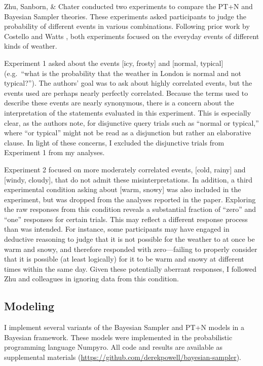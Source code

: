 \documentclass[
  english,
  man,floatsintext]{apa6}
\begin{document}
Zhu, Sanborn, \& Chater \autocite*{chater.etal2020} conducted two experiments to compare the PT+N and Bayesian Sampler theories. These experiments asked participants to judge the probability of different events in various combinations. Following prior work by Costello and Watts \autocites*[e.g.][]{costello.watts2016,costello.watts2018}, both experiments focused on the everyday events of different kinds of weather.

Experiment 1 asked about the events {[}icy, frosty{]} and {[}normal, typical{]} (e.g.~``what is the probability that the weather in London is normal and not typical?''). The authors' goal was to ask about highly correlated events, but the events used are perhaps nearly perfectly correlated. Because the terms used to describe these events are nearly synonymous, there is a concern about the interpretation of the statements evaluated in this experiment. This is especially clear, as the authors note, for disjunctive query trials such as ``normal or typical,'' where ``or typical'' might not be read as a disjunction but rather an elaborative clause. In light of these concerns, I excluded the disjunctive trials from Experiment 1 from my analyses.

Experiment 2 focused on more moderately correlated events, {[}cold, rainy{]} and {[}windy, cloudy{]}, that do not admit these misinterpretations. In addition, a third experimental condition asking about {[}warm, snowy{]} was also included in the experiment, but was dropped from the analyses reported in the paper. Exploring the raw responses from this condition reveals a substantial fraction of ``zero'' and ``one'' responses for certain trials. This may reflect a different response process than was intended. For instance, some participants may have engaged in deductive reasoning to judge that it is not possible for the weather to at once be warm and snowy, and therefore responded with zero---failing to properly consider that it is possible (at least logically) for it to be warm and snowy at different times within the same day. Given these potentially aberrant responses, I followed Zhu and colleagues \autocite*{zhu.etal2020} in ignoring data from this condition.

\hypertarget{modeling}{%
\subsection{Modeling}\label{modeling}}

I implement several variants of the Bayesian Sampler and PT+N models in a Bayesian framework. These models were implemented in the probabilistic programming language Numpyro. All code and results are available as supplemental materials (\url{https://github.com/derekpowell/bayesian-sampler}).
\end{document}
